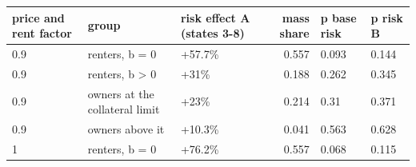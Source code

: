 \begingroup\small
\setlength{\tabcolsep}{3pt}
\renewcommand{\arraystretch}{1.04}
\begin{tabularx}{\linewidth}{XXXrXX}
\toprule
price and rent factor & group & risk effect A (states 3-8) & mass share & p base risk & p risk B \\
\midrule
0.9 & renters, b = 0 & +57.7\% & 0.557 & 0.093 & 0.144 \\
0.9 & renters, b \textgreater{} 0 & +31\% & 0.188 & 0.262 & 0.345 \\
0.9 & owners at the collateral limit & +23\% & 0.214 & 0.31 & 0.371 \\
0.9 & owners above it & +10.3\% & 0.041 & 0.563 & 0.628 \\
1 & renters, b = 0 & +76.2\% & 0.557 & 0.068 & 0.115 \\
\bottomrule
\end{tabularx}
\endgroup
